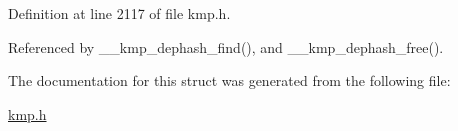 Definition at line 2117 of file kmp.\-h.



Referenced by \-\_\-\-\_\-kmp\-\_\-dephash\-\_\-find(), and \-\_\-\-\_\-kmp\-\_\-dephash\-\_\-free().



The documentation for this struct was generated from the following file\-:\begin{DoxyCompactItemize}
\item 
\hyperlink{kmp_8h}{kmp.\-h}\end{DoxyCompactItemize}
